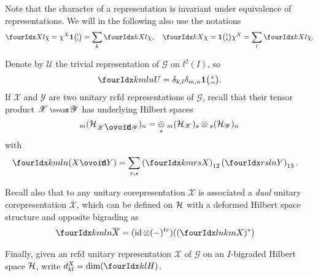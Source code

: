 Note that the character of a representation is invariant under equivalence of representations. We will in the following also use the notations \[\Gr{\chi}{}{X}{}{l} = \chi^X\UnitC{l}{l} =  \sum_k \Gr{\chi}{}{X}{k}{l},\quad \Gr{\chi}{}{X}{k}{}  =\UnitC{k}{k}\chi^X = \sum_{l} \Gr{\chi}{}{X}{k}{l}.\]

 
 


Denote by $\mathscr{U}$ the trivial representation of
 $\mathscr{G}$ on $l^2(I)$, so \[\Gr{U}{k}{l}{m}{n} = \delta_{k,l}\delta_{m,n}\UnitC{k}{m}.\] If $\mathscr{X}$ and $\mathscr{Y}$ are two unitary  rcfd representations of $\mathscr{G}$, recall \cite[Section 2.2]{DCT1} that their tensor product $\mathscr{X}\smCirct \mathscr{Y}$ has underlying Hilbert spaces \[\GrDA{(\Hsp_{\mathscr{X}\Circt\mathscr{Y}})}{m}{n} = \underset{s}{\oplus} \; \GrDA{(\Hsp_{\mathscr{X}})}{m}{s} \otimes \GrDA{(\Hsp_{\mathscr{Y}})}{s}{n}\] with \begin{align*}
  \Gr{(X\Circt Y)}{k}{l}{m}{n} &= \sum_{r,s}
   \left(\Gr{X}{k}{r}{m}{s}\right)_{12}
   \left(\Gr{Y}{r}{l}{s}{n}\right)_{13}.
\end{align*}

Recall also that to any unitary corepresentation $\mathscr{X}$ is associated a \emph{dual} unitary corepresentation $\overline{\mathscr{X}}$, which can be defined on $\mathcal{H}$ with a deformed Hilbert space structure and opposite bigrading as 
\begin{align*}
   \Gr{\overline{X}}{k}{l}{m}{n} &= (\id \otimes
   (-)^{tr})((\Gr{X}{l}{k}{n}{m})^{*})
 \end{align*} 

  Finally, given an rcfd unitary representation $\mathscr{X}$ of
 $\mathscr{G}$ on an $I$-bigraded Hilbert space $\mathcal{H}$, write $d^X_{kl} = \dim(\Gru{H}{k}{l})$. 

